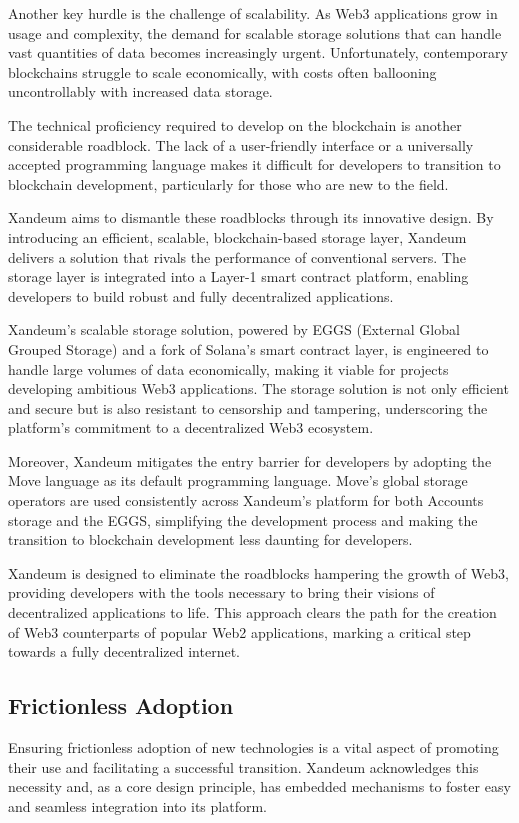\documentclass[11pt]{article}   	%
\begin{document}
Another key hurdle is the challenge of scalability. As Web3 applications grow in usage and complexity, the demand for scalable storage solutions that can handle vast quantities of data becomes increasingly urgent. Unfortunately, contemporary blockchains struggle to scale economically, with costs often ballooning uncontrollably with increased data storage.

The technical proficiency required to develop on the blockchain is another considerable roadblock. The lack of a user-friendly interface or a universally accepted programming language makes it difficult for developers to transition to blockchain development, particularly for those who are new to the field.

Xandeum aims to dismantle these roadblocks through its innovative design. By introducing an efficient, scalable, blockchain-based storage layer, Xandeum delivers a solution that rivals the performance of conventional servers. The storage layer is integrated into a Layer-1 smart contract platform, enabling developers to build robust and fully decentralized applications.

Xandeum's scalable storage solution, powered by EGGS (External Global Grouped Storage) and a fork of Solana's smart contract layer, is engineered to handle large volumes of data economically, making it viable for projects developing ambitious Web3 applications. The storage solution is not only efficient and secure but is also resistant to censorship and tampering, underscoring the platform's commitment to a decentralized Web3 ecosystem.

Moreover, Xandeum mitigates the entry barrier for developers by adopting the Move language as its default programming language. Move's global storage operators are used consistently across Xandeum's platform for both Accounts storage and the EGGS, simplifying the development process and making the transition to blockchain development less daunting for developers.

Xandeum is designed to eliminate the roadblocks hampering the growth of Web3, providing developers with the tools necessary to bring their visions of decentralized applications to life. This approach clears the path for the creation of Web3 counterparts of popular Web2 applications, marking a critical step towards a fully decentralized internet.

\subsection{Frictionless Adoption}
Ensuring frictionless adoption of new technologies is a vital aspect of promoting their use and facilitating a successful transition. Xandeum acknowledges this necessity and, as a core design principle, has embedded mechanisms to foster easy and seamless integration into its platform.
\end{document}
